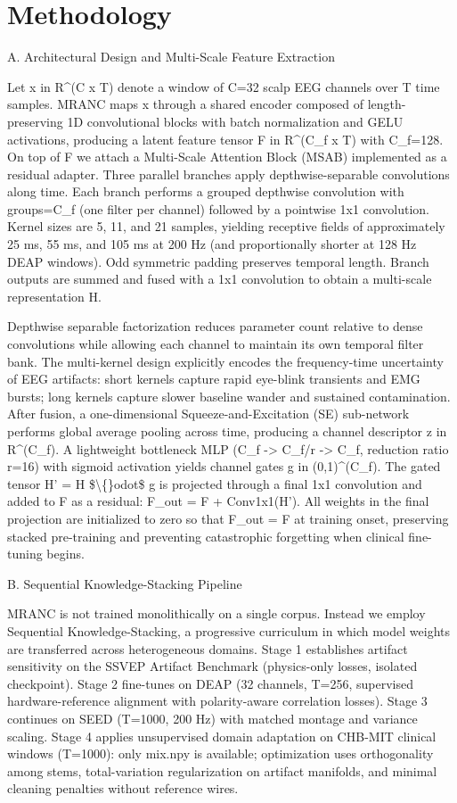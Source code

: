 \documentclass[journal,twocolumn]{IEEEtran}
\begin{document}
\section{Methodology}\label{sec:methodology}
A. Architectural Design and Multi-Scale Feature Extraction

Let x in R\textasciicircum{}(C x T) denote a window of C=32 scalp EEG channels over T time samples. MRANC maps x through a shared encoder composed of length-preserving 1D convolutional blocks with batch normalization and GELU activations, producing a latent feature tensor F in R\textasciicircum{}(C\_f x T) with C\_f=128. On top of F we attach a Multi-Scale Attention Block (MSAB) implemented as a residual adapter. Three parallel branches apply depthwise-separable convolutions along time. Each branch performs a grouped depthwise convolution with groups=C\_f (one filter per channel) followed by a pointwise 1x1 convolution. Kernel sizes are 5, 11, and 21 samples, yielding receptive fields of approximately 25 ms, 55 ms, and 105 ms at 200 Hz (and proportionally shorter at 128 Hz DEAP windows). Odd symmetric padding preserves temporal length. Branch outputs are summed and fused with a 1x1 convolution to obtain a multi-scale representation H.

Depthwise separable factorization reduces parameter count relative to dense convolutions while allowing each channel to maintain its own temporal filter bank. The multi-kernel design explicitly encodes the frequency-time uncertainty of EEG artifacts: short kernels capture rapid eye-blink transients and EMG bursts; long kernels capture slower baseline wander and sustained contamination. After fusion, a one-dimensional Squeeze-and-Excitation (SE) sub-network performs global average pooling across time, producing a channel descriptor z in R\textasciicircum{}(C\_f). A lightweight bottleneck MLP (C\_f -> C\_f/r -> C\_f, reduction ratio r=16) with sigmoid activation yields channel gates g in (0,1)\textasciicircum{}(C\_f). The gated tensor H' = H \$\textbackslash\{\}odot\$ g is projected through a final 1x1 convolution and added to F as a residual: F\_out = F + Conv1x1(H'). All weights in the final projection are initialized to zero so that F\_out = F at training onset, preserving stacked pre-training and preventing catastrophic forgetting when clinical fine-tuning begins.

B. Sequential Knowledge-Stacking Pipeline

MRANC is not trained monolithically on a single corpus. Instead we employ Sequential Knowledge-Stacking, a progressive curriculum in which model weights are transferred across heterogeneous domains. Stage 1 establishes artifact sensitivity on the SSVEP Artifact Benchmark (physics-only losses, isolated checkpoint). Stage 2 fine-tunes on DEAP (32 channels, T=256, supervised hardware-reference alignment with polarity-aware correlation losses). Stage 3 continues on SEED (T=1000, 200 Hz) with matched montage and variance scaling. Stage 4 applies unsupervised domain adaptation on CHB-MIT \cite{shoeb2010chb} clinical windows (T=1000): only mix.npy is available; optimization uses orthogonality among stems, total-variation regularization on artifact manifolds, and minimal cleaning penalties without reference wires.
\end{document}
